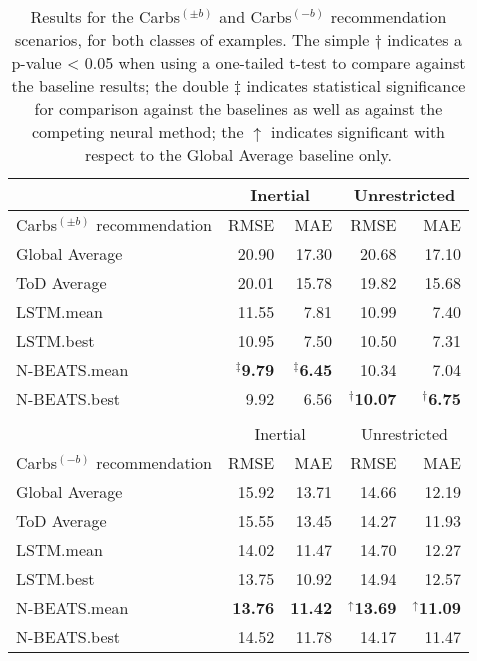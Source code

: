\begin{table*}[t]\setlength{\tabcolsep}{4pt}
\caption{Results for the Carbs$^{(\pm b)}$ and Carbs$^{(-b)}$ recommendation scenarios, for both classes of examples. The simple $\dagger$ indicates a p-value < 0.05 when using a one-tailed t-test to compare against the baseline results; the double $\ddagger$ indicates statistical significance for comparison against the baselines as well as against the competing neural method; the $\uparrow$ indicates significant with respect to the Global Average baseline only.}
\begin{center}
\label{tab:carb_results}
\small
\begin{tabular}{|l|rr|rr|}
   	\cline{2-5}
	\multicolumn{1}{c}{} & \multicolumn{2}{|c|}{Inertial} & \multicolumn{2}{c|}{Unrestricted}\\
	\hline
	Carbs$^{(\pm b)}$ recommendation & RMSE & MAE & RMSE & MAE\\
	\hline
	Global Average & 20.90 & 17.30 & 20.68 & 17.10\\
	ToD Average & 20.01 & 15.78 & 19.82 & 15.68\\
	\hline
	LSTM.mean & 11.55 & 7.81 & 10.99 & 7.40\\
	LSTM.best & 10.95 & 7.50 & 10.50 & 7.31\\
	\hline
	N-BEATS.mean & $^\ddagger${\bf 9.79} & $^\ddagger${\bf 6.45} & 10.34 & 7.04\\
	N-BEATS.best & 9.92 & 6.56 & $^\dagger${\bf 10.07} & $^\dagger${\bf 6.75}\\
	\hline
	\multicolumn{5}{c}{}\\[-1.5ex]
	\cline{2-5}
	\multicolumn{1}{c}{} & \multicolumn{2}{|c|}{Inertial} & \multicolumn{2}{c|}{Unrestricted}\\
	\hline
	Carbs$^{(-b)}$ recommendation & RMSE & MAE & RMSE & MAE\\
	\hline
	Global Average & 15.92 & 13.71 & 14.66 & 12.19\\
	ToD Average & 15.55 & 13.45 & 14.27 & 11.93\\
	\hline
	LSTM.mean & 14.02 & 11.47 & 14.70 & 12.27\\
	LSTM.best & 13.75 & 10.92 & 14.94 & 12.57\\
	\hline
	N-BEATS.mean & {\bf 13.76} & {\bf 11.42} & $^\uparrow${\bf 13.69} & $^\uparrow${\bf 11.09}\\
	N-BEATS.best & 14.52 & 11.78 & 14.17 & 11.47\\
	\hline
\end{tabular}
\end{center}
\end{table*}

